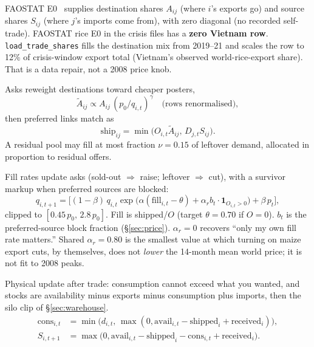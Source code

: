 FAOSTAT E0~\citep{faostat_trade} supplies destination shares $A_{ij}$
(where $i$'s exports go) and source shares $S_{ij}$ (where $j$'s imports
come from), with zero diagonal (no recorded self-trade). FAOSTAT rice E0 in
the crisis files has a \textbf{zero Vietnam row}.
\texttt{load\_trade\_shares} fills the destination mix from 2019--21 and
scales the row to 12\% of crisis-window export total (Vietnam's observed
world-rice-export share). That is a data repair, not a 2008 price knob.

Asks reweight destinations toward cheaper posters,
\begin{equation}
\label{eq:ask-reweight}
\tilde A_{ij}\propto A_{ij}\,(p_0/q_{i,t})^{\gamma}
\quad\text{(rows renormalised)},
\end{equation}
then preferred links match as
\begin{equation}
\label{eq:armington}
\mathrm{ship}_{ij}=\min\bigl(O_{i,t}\tilde A_{ij},\,D_{j,t}S_{ij}\bigr).
\end{equation}
A residual pool may fill at most fraction $\nu=0.15$ of leftover demand,
allocated in proportion to residual offers.

Fill rates update asks (sold-out $\Rightarrow$ raise; leftover $\Rightarrow$
cut), with a survivor markup when preferred sources are blocked:
\begin{equation}
\label{eq:ask}
q_{i,t+1}
=\bigl[(1-\beta)\,q_{i,t}\exp\bigl(\alpha(\mathrm{fill}_{i,t}-\theta)
+\alpha_r b_t\cdot\mathbf{1}_{O_{i,t}>0}\bigr)
+\beta\,p_t\bigr],
\end{equation}
clipped to $[0.45\,p_0,\,2.8\,p_0]$. Fill is shipped/$O$ (target
$\theta=0.70$ if $O=0$). $b_t$ is the preferred-source block fraction
(\S\ref{sec:price}). $\alpha_r=0$ recovers ``only my own fill rate matters.''
Shared $\alpha_r=0.80$ is the smallest value at which turning on maize
export cuts, by themselves, does not \emph{lower} the 14-month mean world
price; it is not fit to 2008 peaks.

Physical update after trade: consumption cannot exceed what you wanted, and
stocks are availability minus exports minus consumption plus imports, then
the silo clip of \S\ref{sec:warehouse}.
\begin{align}
\mathrm{cons}_{i,t}&=\min\bigl(d_{i,t},\,\max(0,\mathrm{avail}_{i,t}-\mathrm{shipped}_i+\mathrm{received}_i)\bigr),\\
S_{i,t+1}&=\max\bigl(0,\mathrm{avail}_{i,t}-\mathrm{shipped}_i-\mathrm{cons}_{i,t}+\mathrm{received}_i\bigr).
\end{align}

